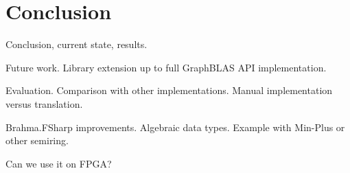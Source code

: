 \section{Conclusion}

Conclusion, current state, results.

Future work. Library extension up to full GraphBLAS API implementation.

Evaluation. Comparison with other implementations. Manual implementation versus translation.  

Brahma.FSharp improvements. 
Algebraic data types. Example with Min-Plus or other semiring.

Can we use it on FPGA? 